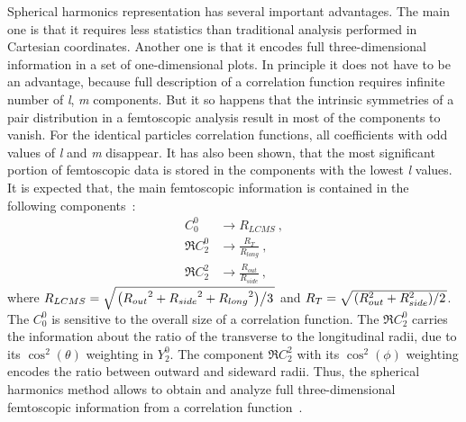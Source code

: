       Spherical harmonics representation has several important advantages.
      The main one is that it requires less statistics than traditional analysis performed in Cartesian coordinates.
      Another one is that it encodes full three-dimensional information in a set of one-dimensional plots. 
      In principle it does not have to be an advantage, because full description of a correlation function requires infinite number of \textit{l}, \textit{m} components.
      But it so happens that the intrinsic symmetries of a pair distribution in a femtoscopic analysis result in most of the components to vanish.
      For the identical particles correlation functions, all coefficients with odd values of \textit{l} and \textit{m} disappear.
      It has also been shown, that the most significant portion of femtoscopic data is stored in the components with the lowest \textit{l} values.
      It is expected that, the main femtoscopic information is contained in the following components~\cite{nonidfemto}:
      \begin{align}
        C^0_0 &\to R_{LCMS}~, \\
        \Re C^0_2 &\to \frac{R_T}{R_{long}}~, \\
        \Re C^2_2 &\to \frac{R_{out}}{R_{side}}~,
      \end{align}
      where $R_{LCMS} = \sqrt{ \left. \left( {R_{out}}^2 + {R_{side}}^2 + {R_{long}}^2 \right) \middle/ 3 \right. }$ and $R_{T} = \sqrt{ \left. \left( R_{out}^2 + R_{side}^2 \right) \middle/2 \right. }$.
      The $C^0_0$ is sensitive to the overall size of a correlation function.
      The $\Re C^0_2$ carries the information about the ratio of the transverse to the longitudinal radii, due to its $\cos^2(\theta)$ weighting in $Y^0_2$.
      The component $\Re C^2_2$ with its $\cos^2(\phi)$ weighting encodes the ratio between outward and sideward radii.
      Thus, the spherical harmonics method allows to obtain and analyze full three-dimensional femtoscopic information from a correlation function~\cite{nonidfemto}.

